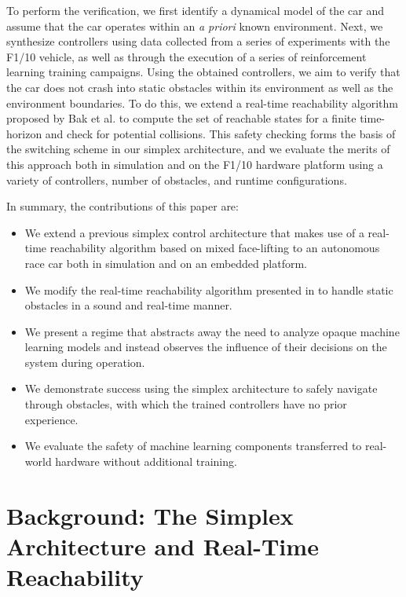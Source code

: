 \documentclass[manuscript,screen,review]{acmart}
\begin{document}
To perform the verification, we first identify a dynamical model of the car and assume that the car operates within an \textit{a priori} known environment. Next, we synthesize controllers using data collected from a series of experiments with the F1/10 vehicle, as well as through the execution of a series of reinforcement learning training campaigns. Using the obtained controllers, we aim to verify that the car does not crash into static obstacles within its environment as well as the environment boundaries. To do this, we extend a real-time reachability algorithm proposed by Bak et al. \cite{Bak2014,Johnson2016} to compute the set of reachable states for a finite time-horizon and check for potential collisions. This safety checking forms the basis of the switching scheme in our simplex architecture, and we evaluate the merits of this approach both in simulation and on the F1/10 hardware platform using a variety of controllers, number of obstacles, and runtime configurations.

In summary, the contributions of this paper are: \raggedbottom
\begin{itemize}%
    \item We extend a previous simplex control architecture that makes use of a real-time reachability algorithm based on mixed face-lifting to an autonomous race car both in simulation and on an embedded platform.
    \item We modify the real-time reachability algorithm presented in \cite{Bak2014} to handle static obstacles in a sound and real-time manner.
    \item We present a regime that abstracts away the need to analyze opaque machine learning models and instead observes the influence of their decisions on the system during operation.
    \item We demonstrate success using the simplex architecture to safely navigate through obstacles, with which the trained controllers have no prior experience.
    \item We evaluate the safety of machine learning components transferred to real-world hardware without additional training.
    
\end{itemize}%



\section{Background: The Simplex Architecture and Real-Time Reachability}
\end{document}
